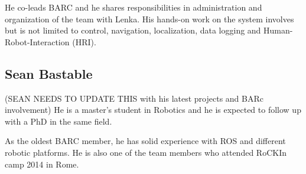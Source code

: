 He co-leads BARC and he shares responsibilities in administration and organization of the team with Lenka. His hands-on work on the system involves but is not limited to control, navigation, localization, data logging and Human-Robot-Interaction (HRI).




\subsection{Sean Bastable}

(SEAN NEEDS TO UPDATE THIS with his latest projects and BARc involvement) He is a master's student in Robotics and he is expected to follow up with a PhD in the same field.


 As the oldest BARC member, he has solid experience with ROS and different robotic platforms. He is also one of the team members who attended RoCKIn camp 2014 in Rome.

 
 



